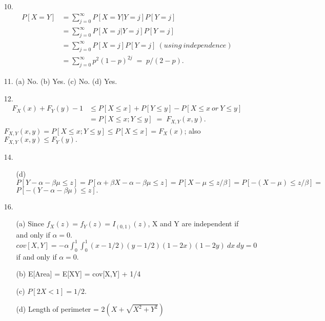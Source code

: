 \begin{enumerate}
	\item[10.] ${}$\vspace{-7.0ex}
	\begin{align*} P[X=Y] &= \sum_{j=0}^{\infty} P[X=Y\vert Y=j]P[Y=j] \\ 
	&= \sum_{j=0}^{\infty} P[X=j\vert Y=j]P[Y=j] \\ 
	&= \sum_{j=0}^{\infty} P[X=j]P[Y=j]\ (using\ independence) \\
	&= \sum_{j=0}^{\infty} p^2(1-p)^{2j} \;=\; p/(2-p).
	\end{align*}
	
	\item[11.] (a) No. (b) Yes. (c) No. (d) Yes.
	
	\newpage
	\item[12.] ${}$\vspace{-7.0ex}
	\begin{align*} F_X(x) + F_Y(y) -1 &\le P[X\le x] + P[Y\le y] - P[X\le x\ or\ Y\le y]  \\ 
	&= P[X\le x; Y\le y] \;=\; F_{X,Y}(x,y). 
	\end{align*} 
	$F_{X,Y}(x,y) = P[X\le x; Y\le y] \le P[X\le x] = F_X(x)$; also \\
	$F_{X,Y}(x,y) \le F_Y(y).$
	
	\item[14.]  ${}$\vspace{-7.0ex}\begin{itemize}
		\item[(d)] $P[Y-\alpha-\beta\mu\le z] = P[\alpha+\beta X - \alpha-\beta\mu\le z] = P[X-\mu\le z/\beta] = P[-(X-\mu)\le z/\beta]=$ \\
		$P[-(Y-\alpha-\beta\mu) \le z].$ 
	\end{itemize}
	
	\item[16.]  ${}$\vspace{-7.0ex} \begin{itemize}
		\item[(a)] Since $f_X(z) =f_Y(z) = I_{(0,1)}(z)$, X and Y are independent if and only if  $\alpha=0$. \\
				$\displaystyle cov[X,Y] = -\alpha\int_0^1\int_0^1(x-1/2)(y-1/2)(1-2x)(1-2y)\ dx\ dy = 0$ if and only if $\alpha = 0.$
		\item[(b)] E[Area] = E[XY] = cov[X,Y] + 1/4
		\item[(c)] $P[2X < 1] = 1/2.$
		\item[(d)] Length of perimeter = $2(X + \sqrt{X^2+Y^2})$
	\end{itemize}
	

\end{enumerate}
